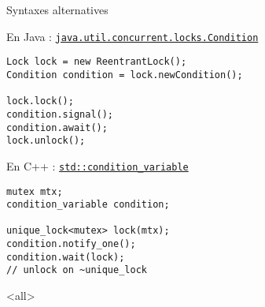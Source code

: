 \begin{frame}[fragile]{Syntaxes alternatives}
  \begin{block}{En Java : \href{https://docs.oracle.com/javase/7/docs/api/java/util/concurrent/locks/Condition.html}{\lstinline{java.util.concurrent.locks.Condition}}}
\begin{lstlisting}
Lock lock = new ReentrantLock();
Condition condition = lock.newCondition(); 

lock.lock();
condition.signal();
condition.await();
lock.unlock();
\end{lstlisting}
\end{block}
  \begin{block}{En C++ : \href{http://www.cplusplus.com/reference/condition_variable/condition_variable/}{\lstinline{std::condition_variable}}}
\begin{lstlisting}
mutex mtx;
condition_variable condition;

unique_lock<mutex> lock(mtx);
condition.notify_one();
condition.wait(lock);
// unlock on ~unique_lock
\end{lstlisting}
\end{block}
\end{frame}

\mode<all>

